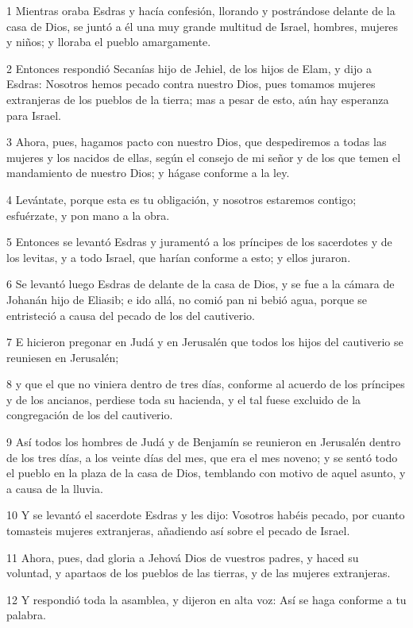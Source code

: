 \par 1 Mientras oraba Esdras y hacía confesión, llorando y postrándose delante de la casa de Dios, se juntó a él una muy grande multitud de Israel, hombres, mujeres y niños; y lloraba el pueblo amargamente.
\par 2 Entonces respondió Secanías hijo de Jehiel, de los hijos de Elam, y dijo a Esdras: Nosotros hemos pecado contra nuestro Dios, pues tomamos mujeres extranjeras de los pueblos de la tierra; mas a pesar de esto, aún hay esperanza para Israel.
\par 3 Ahora, pues, hagamos pacto con nuestro Dios, que despediremos a todas las mujeres y los nacidos de ellas, según el consejo de mi señor y de los que temen el mandamiento de nuestro Dios; y hágase conforme a la ley.
\par 4 Levántate, porque esta es tu obligación, y nosotros estaremos contigo; esfuérzate, y pon mano a la obra.
\par 5 Entonces se levantó Esdras y juramentó a los príncipes de los sacerdotes y de los levitas, y a todo Israel, que harían conforme a esto; y ellos juraron. 
\par 6 Se levantó luego Esdras de delante de la casa de Dios, y se fue a la cámara de Johanán hijo de Eliasib; e ido allá, no comió pan ni bebió agua, porque se entristeció a causa del pecado de los del cautiverio.
\par 7 E hicieron pregonar en Judá y en Jerusalén que todos los hijos del cautiverio se reuniesen en Jerusalén;
\par 8 y que el que no viniera dentro de tres días, conforme al acuerdo de los príncipes y de los ancianos, perdiese toda su hacienda, y el tal fuese excluido de la congregación de los del cautiverio.
\par 9 Así todos los hombres de Judá y de Benjamín se reunieron en Jerusalén dentro de los tres días, a los veinte días del mes, que era el mes noveno; y se sentó todo el pueblo en la plaza de la casa de Dios, temblando con motivo de aquel asunto, y a causa de la lluvia.
\par 10 Y se levantó el sacerdote Esdras y les dijo: Vosotros habéis pecado, por cuanto tomasteis mujeres extranjeras, añadiendo así sobre el pecado de Israel.
\par 11 Ahora, pues, dad gloria a Jehová Dios de vuestros padres, y haced su voluntad, y apartaos de los pueblos de las tierras, y de las mujeres extranjeras.
\par 12 Y respondió toda la asamblea, y dijeron en alta voz: Así se haga conforme a tu palabra.

